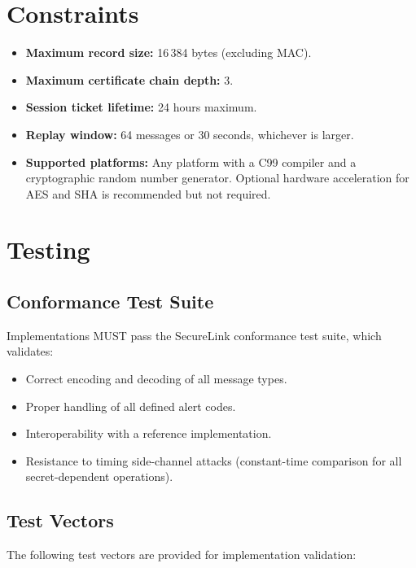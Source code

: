 \documentclass[
    language=english,
    doctype=article,
    institution=none,
]{../../omnilatex}
\begin{document}
\section{Constraints}

\begin{itemize}
    \item \textbf{Maximum record size:} 16\,384 bytes (excluding MAC).
    \item \textbf{Maximum certificate chain depth:} 3.
    \item \textbf{Session ticket lifetime:} 24 hours maximum.
    \item \textbf{Replay window:} 64 messages or 30 seconds, whichever is
          larger.
    \item \textbf{Supported platforms:} Any platform with a C99 compiler and
          a cryptographic random number generator.  Optional hardware
          acceleration for AES and SHA is recommended but not required.
\end{itemize}

\section{Testing}

\subsection{Conformance Test Suite}

Implementations MUST pass the SecureLink conformance test suite, which
validates:

\begin{itemize}
    \item Correct encoding and decoding of all message types.
    \item Proper handling of all defined alert codes.
    \item Interoperability with a reference implementation.
    \item Resistance to timing side-channel attacks (constant-time comparison
          for all secret-dependent operations).
\end{itemize}

\subsection{Test Vectors}

The following test vectors are provided for implementation validation:
\end{document}
